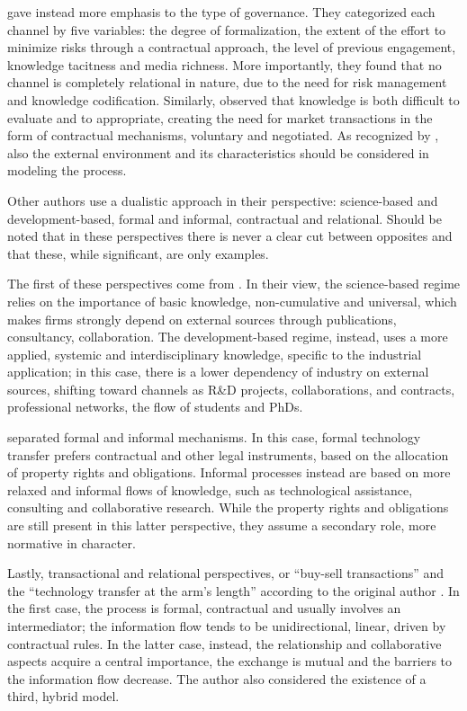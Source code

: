 \citet{Alexander2013} gave instead more emphasis to the type of governance. They categorized each channel by five variables: the degree of formalization, the extent of the effort to minimize risks through a contractual approach, the level of previous engagement, knowledge tacitness and media richness. More importantly, they found that no channel is completely relational in nature, due to the need for risk management and knowledge codification. Similarly, \citet{Bercovitz2006} observed that knowledge is both difficult to evaluate and to appropriate, creating the need for market transactions in the form of contractual mechanisms, voluntary and negotiated. As recognized by \citet{Rogers2001}, also the external environment and its characteristics should be considered in modeling the process.

Other authors use a dualistic approach in their perspective: science-based and development-based, formal and informal, contractual and relational. Should be noted that in these perspectives there is never a clear cut between opposites and that these, while significant, are only examples.

The first of these perspectives come from \citet{Gilsing2011}. In their view, the science-based regime relies on the importance of basic knowledge, non-cumulative and universal, which makes firms strongly depend on external sources through publications, consultancy, collaboration. The development-based regime, instead, uses a more applied, systemic and interdisciplinary knowledge, specific to the industrial application; in this case, there is a lower dependency of industry on external sources, shifting toward channels as R\&D projects, collaborations, and contracts, professional networks, the flow of students and PhDs. 

\citet{Link2007} separated formal and informal mechanisms. In this case, formal technology transfer prefers contractual and other legal instruments, based on the allocation of property rights and obligations. Informal processes instead are based on more relaxed and informal flows of knowledge, such as technological assistance, consulting and collaborative research. While the property rights and obligations are still present in this latter perspective, they assume a secondary role, more normative in character.

Lastly, transactional and relational perspectives, or \enquote{buy-sell transactions} and the \enquote{technology transfer at the arm's length} according to the original author \citep{Harmon1997}. In the first case, the process is formal, contractual and usually involves an intermediator; the information flow tends to be unidirectional, linear, driven by contractual rules. In the latter case, instead, the relationship and collaborative aspects acquire a central importance, the exchange is mutual and the barriers to the information flow decrease. The author also considered the existence of a third, hybrid model. 

